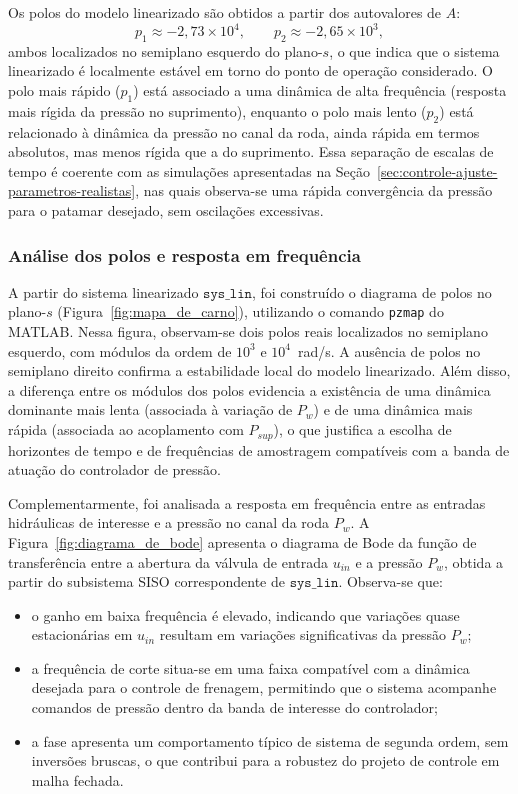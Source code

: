 Os polos do modelo linearizado são obtidos a partir dos autovalores de $A$:
\[
    p_1 \approx -2{,}73\times 10^{4},
    \qquad
    p_2 \approx -2{,}65\times 10^{3},
\]
ambos localizados no semiplano esquerdo do plano-$s$, o que indica que o sistema linearizado é localmente estável em torno do ponto de operação considerado. O polo mais rápido ($p_1$) está associado a uma dinâmica de alta frequência (resposta mais rígida da pressão no suprimento), enquanto o polo mais lento ($p_2$) está relacionado à dinâmica da pressão no canal da roda, ainda rápida em termos absolutos, mas menos rígida que a do suprimento. Essa separação de escalas de tempo é coerente com as simulações apresentadas na Seção~\ref{sec:controle-ajuste-parametros-realistas}, nas quais observa-se uma rápida convergência da pressão para o patamar desejado, sem oscilações excessivas.

\subsubsection*{Análise dos polos e resposta em frequência}

A partir do sistema linearizado $\texttt{sys\_lin}$, foi construído o diagrama de polos no plano-$s$ (Figura~\ref{fig:mapa_de_carno}), utilizando o comando \texttt{pzmap} do MATLAB. Nessa figura, observam-se dois polos reais localizados no semiplano esquerdo, com módulos da ordem de $10^{3}$ e $10^{4}$~rad/s. A ausência de polos no semiplano direito confirma a estabilidade local do modelo linearizado. Além disso, a diferença entre os módulos dos polos evidencia a existência de uma dinâmica dominante mais lenta (associada à variação de $P_w$) e de uma dinâmica mais rápida (associada ao acoplamento com $P_{sup}$), o que justifica a escolha de horizontes de tempo e de frequências de amostragem compatíveis com a banda de atuação do controlador de pressão.

Complementarmente, foi analisada a resposta em frequência entre as entradas hidráulicas de interesse e a pressão no canal da roda $P_w$. A Figura~\ref{fig:diagrama_de_bode} apresenta o diagrama de Bode da função de transferência entre a abertura da válvula de entrada $u_{in}$ e a pressão $P_w$, obtida a partir do subsistema SISO correspondente de $\texttt{sys\_lin}$. Observa-se que:
\begin{itemize}
    \item o ganho em baixa frequência é elevado, indicando que variações quase estacionárias em $u_{in}$ resultam em variações significativas da pressão $P_w$;
    \item a frequência de corte situa-se em uma faixa compatível com a dinâmica desejada para o controle de frenagem, permitindo que o sistema acompanhe comandos de pressão dentro da banda de interesse do controlador;
    \item a fase apresenta um comportamento típico de sistema de segunda ordem, sem inversões bruscas, o que contribui para a robustez do projeto de controle em malha fechada.
\end{itemize}

